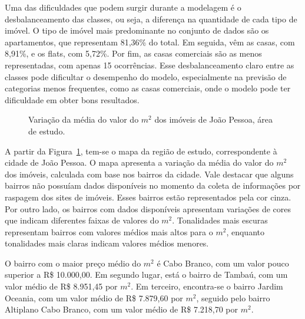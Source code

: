 \documentclass[
  12pt,
  a4paper,
]{scrreprt}
\begin{document}
\vspace{12pt}

Uma das dificuldades que podem surgir durante a modelagem é o
desbalanceamento das classes, ou seja, a diferença na quantidade de cada
tipo de imóvel. O tipo de imóvel mais predominante no conjunto de dados
são os apartamentos, que representam 81,36\% do total. Em seguida, vêm
as casas, com 8,91\%, e os flats, com 5,72\%. Por fim, as casas
comerciais são as menos representadas, com apenas 15 ocorrências. Esse
desbalanceamento claro entre as classes pode dificultar o desempenho do
modelo, especialmente na previsão de categorias menos frequentes, como
as casas comerciais, onde o modelo pode ter dificuldade em obter bons
resultados.

\begin{figure}


\caption{\label{fig-mapa_valor}Variação da média do valor do \(m^2\) dos
imóveis de João Pessoa, área de estudo.}

\end{figure}%

A partir da Figura~\ref{fig-mapa_valor}, tem-se o mapa da região de
estudo, correspondente à cidade de João Pessoa. O mapa apresenta a
variação da média do valor do \(m^2\) dos imóveis, calculada com base
nos bairros da cidade. Vale destacar que alguns bairros não possuíam
dados disponíveis no momento da coleta de informações por raspagem dos
sites de imóveis. Esses bairros estão representados pela cor cinza. Por
outro lado, os bairros com dados disponíveis apresentam variações de
cores que indicam diferentes faixas de valores do \(m^2\). Tonalidades
mais escuras representam bairros com valores médios mais altos para o
\(m^2\), enquanto tonalidades mais claras indicam valores médios
menores.

\vspace{12pt}

O bairro com o maior preço médio do \(m^2\) é Cabo Branco, com um valor
pouco superior a R\$ 10.000,00. Em segundo lugar, está o bairro de
Tambaú, com um valor médio de R\$ 8.951,45 por \(m^2\). Em terceiro,
encontra-se o bairro Jardim Oceania, com um valor médio de R\$ 7.879,60
por \(m^2\), seguido pelo bairro Altiplano Cabo Branco, com um valor
médio de R\$ 7.218,70 por \(m^2\).

\vspace{12pt}
\end{document}
